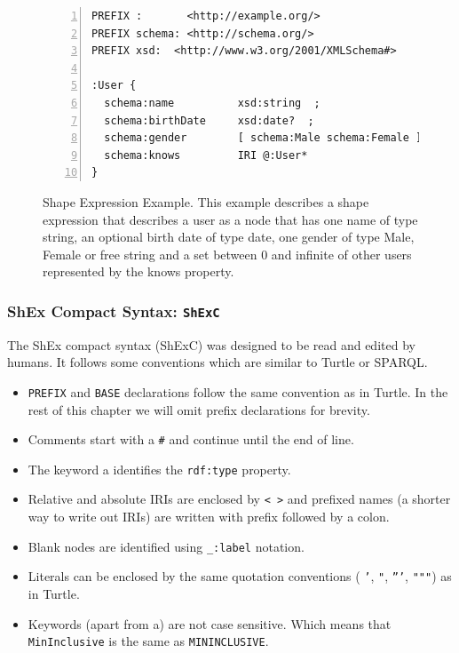 \begin{figure}
\begin{lstlisting}[numbers=left, basicstyle=\ttfamily\scriptsize]
PREFIX :       <http://example.org/>
PREFIX schema: <http://schema.org/>
PREFIX xsd:  <http://www.w3.org/2001/XMLSchema#>

:User {
  schema:name          xsd:string  ;
  schema:birthDate     xsd:date?  ;
  schema:gender        [ schema:Male schema:Female ] OR xsd:string ;
  schema:knows         IRI @:User*
}
\end{lstlisting}
\caption[Shape Expression Example]{Shape Expression Example. This example describes a shape expression that
describes a user as a node that has one name of type string, an optional birth date of type date, one gender
of type Male, Female or free string and a set between 0 and infinite of other users represented by the knows
property.}
\label{fig:shape-expr-ex}
\end{figure}

\subsubsection{ShEx Compact Syntax: \texttt{ShExC}}
The ShEx compact syntax (ShExC) was designed to be read and edited by humans. It follows some conventions which
are similar to Turtle or SPARQL.

\begin{itemize}
    \item \texttt{PREFIX} and \texttt{BASE} declarations follow the same convention as in Turtle. In the rest of
    this chapter we will omit prefix declarations for brevity.
	\item Comments start with a \texttt{\#} and continue until the end of line.
	\item The keyword a identifies the \texttt{rdf:type} property.
    \item Relative and absolute IRIs are enclosed by \texttt{< >} and prefixed names (a shorter way to write
    out IRIs) are written with prefix followed by a colon.
	\item Blank nodes are identified using \texttt{\_:label} notation.
    \item Literals can be enclosed by the same quotation conventions ( \texttt{'}, \texttt{"}, \texttt{'''},
    \texttt{"""}) as in Turtle.
    \item Keywords (apart from a) are not case sensitive. Which means that \texttt{MinInclusive} is the same
    as \texttt{MININCLUSIVE}.
\end{itemize}

